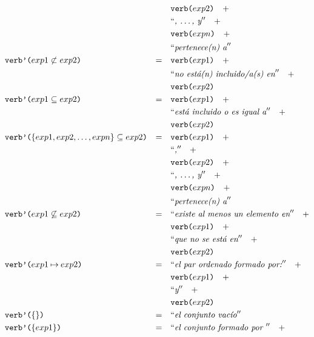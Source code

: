 \begin{align*}
& &											 		& \nlgfun{verb($exp2$)} \quad +  \\
& &											 		& \nlgtext{, \ldots , y} \quad +  \\
& &											 		& \nlgfun{verb($expn$)} \quad +  \\
& &											 		& \nlgtext{pertenece(n) a}  \\
&\nlgfun{verb'($exp1 \not\subset exp2$)} & = \quad & \nlgfun{verb($exp1$)} \quad +  \\
& &											 		& \nlgtext{no está(n) incluido/a(s) en} \quad +  \\
& &											 		& \nlgfun{verb($exp2$)} \\
&\nlgfun{verb'($exp1 \subseteq exp2$)} & = \quad & \nlgfun{verb($exp1$)} \quad +  \\
& &											 		& \nlgtext{está incluido o es igual a} \quad +  \\
& &											 		& \nlgfun{verb($exp2$)} \\
&\nlgfun{verb'($\{exp1, exp2, \ldots , expn\} \subseteq exp2$)} & = \quad & \nlgfun{verb($exp1$)} \quad +  \\
& &											 		& \nlgtext{,} \quad +  \\
& &											 		& \nlgfun{verb($exp2$)} \quad +  \\
& &											 		& \nlgtext{, \ldots , y} \quad +  \\
& &											 		& \nlgfun{verb($expn$)} \quad +  \\
& &											 		& \nlgtext{pertenece(n) a}  \\
&\nlgfun{verb'($exp1 \not\subseteq exp2$)} & = \quad & \nlgtext{existe al menos un elemento en} \quad +  \\
& &											 		& \nlgfun{verb($exp1$)} \quad +  \\
& &											 		& \nlgtext{que no se está en} \quad +  \\
& &											 		& \nlgfun{verb($exp2$)} \\
&\nlgfun{verb'($exp1 \mapsto exp2$)} & = \quad & \nlgtext{el par ordenado formado por:} \quad +  \\
& &											 		& \nlgfun{verb($exp1$)} \quad +  \\
& &											 		& \nlgtext{y} \quad +  \\
& &											 		& \nlgfun{verb($exp2$)} \\
&\nlgfun{verb'($\{\}$)} & = \quad & \nlgtext{el conjunto vacío} \\
&\nlgfun{verb'($\{exp1\}$)} & = \quad & \nlgtext{el conjunto formado por } \quad +  \\

\end{align*}
